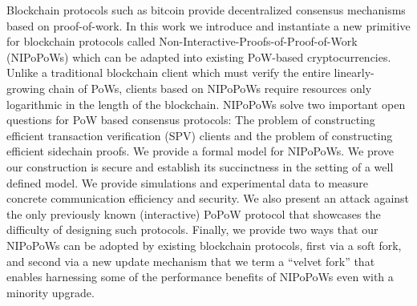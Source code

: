 Blockchain protocols such as bitcoin provide decentralized consensus mechanisms
based on proof-of-work. In this work we introduce and instantiate a new
primitive for blockchain protocols called
Non-Interactive-Proofs-of-Proof-of-Work (NIPoPoWs) which can be adapted into
existing PoW-based cryptocurrencies. Unlike a traditional blockchain client
which must verify the entire linearly-growing chain of PoWs, clients based on
NIPoPoWs require resources only logarithmic in the length of the blockchain.
NIPoPoWs solve two important open questions for PoW based consensus protocols:
The problem of constructing efficient transaction verification (SPV) clients and
the problem of constructing efficient sidechain proofs. We provide a formal
model for NIPoPoWs. We prove our construction is secure and establish its
succinctness in the setting of a well defined model. We provide simulations and
experimental data to measure concrete communication efficiency and security. We
also present an attack against the only previously known (interactive) PoPoW
protocol that showcases the difficulty of designing such protocols. Finally, we
provide two ways that our NIPoPoWs can be adopted by existing blockchain
protocols, first via a soft fork, and second via a new update mechanism that we
term a ``velvet fork'' that enables harnessing some of the performance benefits
of NIPoPoWs even with a minority upgrade.
